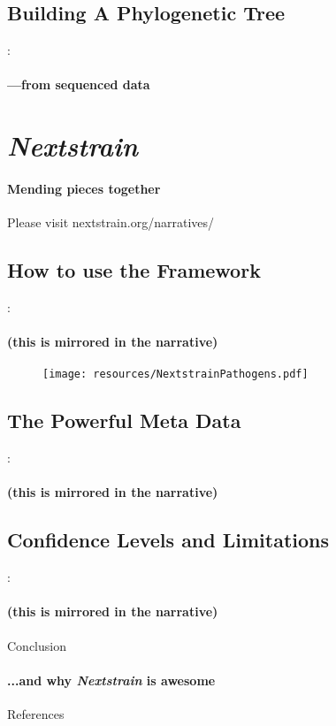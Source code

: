 \documentclass{beamer}
\begin{document}
\begin{darkframes}
    \subsection{Building A Phylogenetic Tree}
    \begin{frame}{\secname : \subsecname}
      \framesubtitle{---from sequenced data}
    \end{frame}

  \section{\textit{Nextstrain}}

    \begin{frame}{\secname}
      \framesubtitle{Mending pieces together}
      Please visit nextstrain.org/narratives/
    \end{frame}

    \subsection{How to use the Framework}
    \begin{frame}{\secname : \subsecname}
      \framesubtitle{(this is mirrored in the narrative)}
      \begin{figure}
        \texttt{[image: resources/NextstrainPathogens.pdf]}
        \caption{\footnotesize }
      \end{figure}
    \end{frame}

    \subsection{The Powerful Meta Data}
    \begin{frame}{\secname : \subsecname}
      \framesubtitle{(this is mirrored in the narrative)}
    \end{frame}

    \subsection{Confidence Levels and Limitations}
    \begin{frame}{\secname : \subsecname}
      \framesubtitle{(this is mirrored in the narrative)}
    \end{frame}

    \begin{frame}{Conclusion}
      \framesubtitle{...and why \textit{Nextstrain} is awesome}
    \end{frame}

    \begin{frame}[allowframebreaks]{References}
    \tiny


    \end{frame}




  \end{darkframes}
\end{document}
